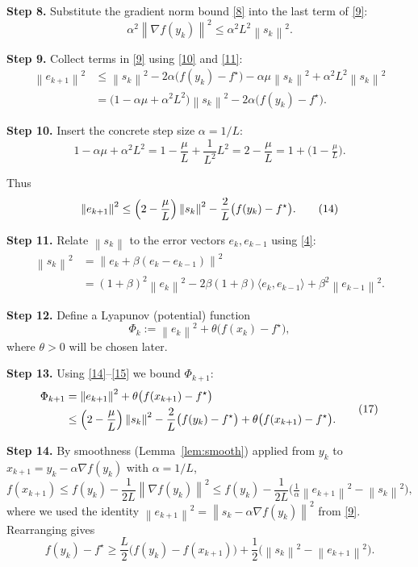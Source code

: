 \documentclass[11pt]{article}
\newcommand{\norm}[1]{\left\|#1\right\|}
\newcommand{\ip}[2]{\langle #1,#2\rangle}
\newcommand{\grad}{\nabla}
\begin{document}
\noindent\textbf{Step 8.} Substitute the gradient norm bound \eqref{8} into the last term of \eqref{9}:
\[
\alpha^2\norm{\grad f(y_k)}^2 \le \alpha^2 L^2 \norm{s_k}^2.
\tag{11}
\]

\noindent\textbf{Step 9.} Collect terms in \eqref{9} using \eqref{10} and \eqref{11}:
\[
\begin{aligned}
\norm{e_{k+1}}^2
&\le \norm{s_k}^2 -2\alpha\bigl(f(y_k)-f^\star\bigr)
      -\alpha\mu \norm{s_k}^2 + \alpha^2 L^2 \norm{s_k}^2 \\
&= \bigl(1-\alpha\mu+\alpha^2 L^2\bigr)\norm{s_k}^2
   -2\alpha\bigl(f(y_k)-f^\star\bigr).
\end{aligned}
\tag{12}
\]

\noindent\textbf{Step 10.} Insert the concrete step size $\alpha=1/L$:
\[
1-\alpha\mu+\alpha^2 L^2
= 1-\frac{\mu}{L}+ \frac{1}{L^2}L^2
= 2-\frac{\mu}{L}
= 1+\bigl(1-\tfrac{\mu}{L}\bigr).
\tag{13}
\]

Thus
\[
\norm{e_{k+1}}^2
\le \Bigl(2-\frac{\mu}{L}\Bigr)\norm{s_k}^2
   -\frac{2}{L}\bigl(f(y_k)-f^\star\bigr).
\tag{14}
\]

\noindent\textbf{Step 11.} Relate $\norm{s_k}$ to the error vectors $e_k,e_{k-1}$ using \eqref{4}:
\[
\begin{aligned}
\norm{s_k}^2
&= \norm{e_k+\beta(e_k-e_{k-1})}^2 \\
&= (1+\beta)^2\norm{e_k}^2 -2\beta(1+\beta)\ip{e_k}{e_{k-1}}
   +\beta^2\norm{e_{k-1}}^2.
\end{aligned}
\tag{15}
\]

\noindent\textbf{Step 12.} Define a Lyapunov (potential) function
\[
\Phi_k := \norm{e_k}^2 + \theta\bigl(f(x_k)-f^\star\bigr),
\tag{16}
\]
where $\theta>0$ will be chosen later.

\noindent\textbf{Step 13.} Using \eqref{14}–\eqref{15} we bound $\Phi_{k+1}$:
\[
\begin{aligned}
\Phi_{k+1}
&= \norm{e_{k+1}}^2 + \theta\bigl(f(x_{k+1})-f^\star\bigr)\\
&\le \Bigl(2-\frac{\mu}{L}\Bigr)\norm{s_k}^2
   -\frac{2}{L}\bigl(f(y_k)-f^\star\bigr)
   +\theta\bigl(f(x_{k+1})-f^\star\bigr).
\end{aligned}
\tag{17}
\]

\noindent\textbf{Step 14.} By smoothness (Lemma~\ref{lem:smooth}) applied from $y_k$ to $x_{k+1}=y_k-\alpha\grad f(y_k)$ with $\alpha=1/L$,
\[
f(x_{k+1}) \le f(y_k) - \frac{1}{2L}\norm{\grad f(y_k)}^2
               \le f(y_k) - \frac{1}{2L} \bigl(\tfrac{1}{\alpha}\norm{e_{k+1}}^2 - \norm{s_k}^2\bigr),
\]
where we used the identity $\norm{e_{k+1}}^2 = \norm{s_k-\alpha\grad f(y_k)}^2$ from \eqref{9}. Rearranging gives
\[
f(y_k)-f^\star \ge \frac{L}{2}\bigl(f(y_k)-f(x_{k+1})\bigr) + \frac{1}{2}\bigl(\norm{s_k}^2 - \norm{e_{k+1}}^2\bigr).
\tag{18}
\]
\end{document}
